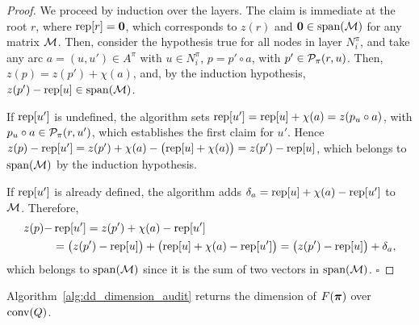 \begin{proof}
We proceed by induction over the layers. The claim is immediate at the root $r$, where
$\operatorname{rep}[r]=\mathbf{0}$, which corresponds to $z(r)$ and $\mathbf{0} \in \operatorname{span}(\mathcal{M})$ for any matrix $\mathcal{M}$. Then, consider the hypothesis true for all nodes in layer $N^\pi_i$, and take any arc $a=(u,u')\in A^\pi$ with $ u \in N^\pi_i$,  $p=p'\circ a$, with $p'\in\mathcal{P}_\pi(r,u)$. Then, $z(p)=z(p')+\chi(a)$, and, by the induction hypothesis, $z(p')-\operatorname{rep}[u]\in\operatorname{span}(\mathcal{M})$.

If $\operatorname{rep}[u']$ is undefined, the algorithm sets $\operatorname{rep}[u']=\operatorname{rep}[u]+\chi(a)=z(p_u\circ a)$, with $p_u\circ a\in\mathcal{P}_\pi(r,u')$, which establishes the first claim for $u'$. Hence 
$z(p)-\operatorname{rep}[u']
=
z(p')+\chi(a)-\bigl(\operatorname{rep}[u]+\chi(a)\bigr)
=
z(p')-\operatorname{rep}[u]$, which belongs to $\operatorname{span}(\mathcal{M})$ by the induction hypothesis.

If $\operatorname{rep}[u']$ is already defined, the algorithm adds $\delta_a=\operatorname{rep}[u]+\chi(a)-\operatorname{rep}[u'] $ to $\mathcal{M}$. Therefore,
\[
\begin{aligned}
z(p)-&\operatorname{rep}[u']
=z(p')+\chi(a)-\operatorname{rep}[u'] \\
&=\bigl(z(p')-\operatorname{rep}[u]\bigr)
+\bigl(\operatorname{rep}[u]+\chi(a)-\operatorname{rep}[u']\bigr) =\bigl(z(p')-\operatorname{rep}[u]\bigr)+\delta_a,
\end{aligned}
\]
which belongs to $\operatorname{span}(\mathcal{M})$ since it is the sum of two vectors in $\operatorname{span}(\mathcal{M})$. \hfill $\square$
\end{proof}

\begin{theorem} \label{thm:dimension_certificate}
Algorithm~\ref{alg:dd_dimension_audit} returns the dimension of $F(\bm{\pi})$ over $\operatorname{conv}(Q)$.
\end{theorem}

